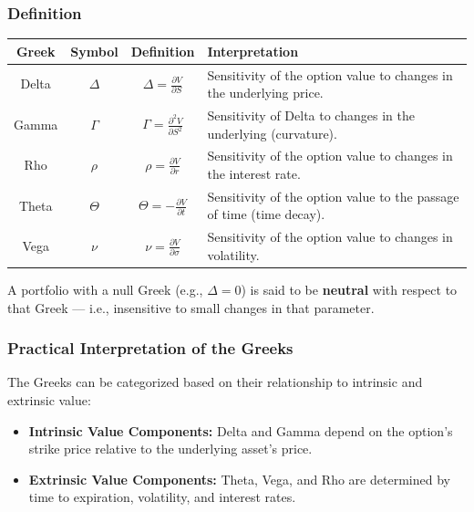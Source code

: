 \documentclass[12pt,a4paper]{article}
\theoremstyle{definition}
\begin{document}
\subsubsection{Definition}

\begin{center}
\begin{tabular}{|c|c|c|p{8cm}|}
\hline
\textbf{Greek} & \textbf{Symbol} & \textbf{Definition} & \textbf{Interpretation} \\
\hline
Delta & $\Delta$ & $\Delta = \frac{\partial V}{\partial S}$ & Sensitivity of the option value to changes in the underlying price. \\
\hline
Gamma & $\Gamma$ & $\Gamma = \frac{\partial^2 V}{\partial S^2}$ & Sensitivity of Delta to changes in the underlying (curvature). \\
\hline
Rho & $\rho$ & $\rho = \frac{\partial V}{\partial r}$ & Sensitivity of the option value to changes in the interest rate. \\
\hline
Theta & $\Theta$ & $\Theta = -\frac{\partial V}{\partial t}$ & Sensitivity of the option value to the passage of time (time decay). \\
\hline
Vega & $\nu$ & $\nu = \frac{\partial V}{\partial \sigma}$ & Sensitivity of the option value to changes in volatility. \\
\hline
\end{tabular}
\end{center}

A portfolio with a null Greek (e.g., $\Delta = 0$) is said to be \textbf{neutral} with respect to that Greek — i.e., insensitive to small changes in that parameter.

\subsubsection{Practical Interpretation of the Greeks}

The Greeks can be categorized based on their relationship to intrinsic and extrinsic value:

\begin{itemize}
\item \textbf{Intrinsic Value Components:} Delta and Gamma depend on the option's strike price relative to the underlying asset's price.
\item \textbf{Extrinsic Value Components:} Theta, Vega, and Rho are determined by time to expiration, volatility, and interest rates.
\end{itemize}
\end{document}
